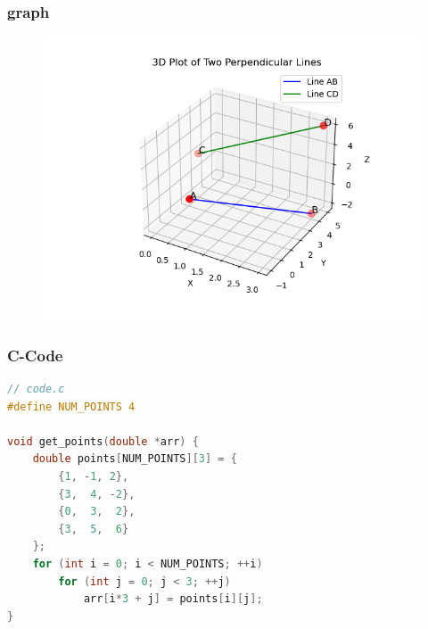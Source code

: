 \documentclass{beamer}
\begin{document}
\begin{frame}
\frametitle{graph}
\begin{figure}[!ht]
    \centering
    \includegraphics[width=\linewidth]{figs/points.png}
    \caption{}
\end{figure}
\end{frame}

\begin{frame}[fragile]
\frametitle{C-Code}
\begin{lstlisting}[language=C]
// code.c
#define NUM_POINTS 4

void get_points(double *arr) {
    double points[NUM_POINTS][3] = {
        {1, -1, 2},
        {3,  4, -2},
        {0,  3,  2},
        {3,  5,  6}
    };
    for (int i = 0; i < NUM_POINTS; ++i)
        for (int j = 0; j < 3; ++j)
            arr[i*3 + j] = points[i][j];
}

 \end{lstlisting}
\end{frame}
\end{document}
